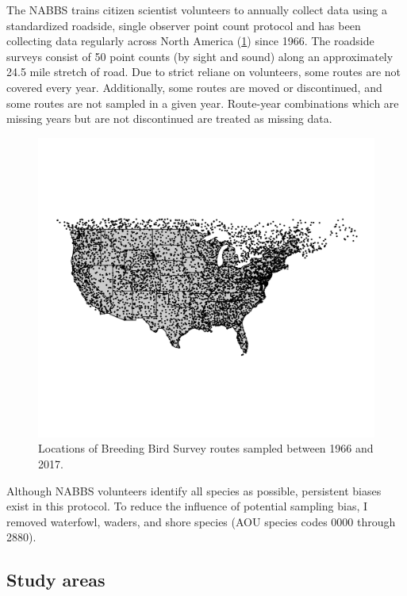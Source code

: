 \documentclass[12pt,twoside,openany]{reedthesis}
\begin{document}
The NABBS trains citizen scientist volunteers to annually collect data
using a standardized roadside, single observer point count protocol and
has been collecting data regularly across North America
(\ref{fig:bbsPoints}) since 1966. The roadside surveys consist of 50
point counts (by sight and sound) along an approximately 24.5 mile
stretch of road. Due to strict reliane on volunteers, some routes are
not covered every year. Additionally, some routes are moved or
discontinued, and some routes are not sampled in a given year.
Route-year combinations which are missing years but are not discontinued
are treated as missing data.
\begin{figure}

{\centering \includegraphics[width=0.85\linewidth]{./chapterFiles/fisherSpatial/figures/figsCalledInDiss/bbsRoutesUsed} 

}

\caption{Locations of Breeding Bird Survey routes sampled between 1966 and 2017.}\label{fig:bbsPoints}
\end{figure}
Although NABBS volunteers identify all species as possible, persistent
biases exist in this protocol. To reduce the influence of potential
sampling bias, I removed waterfowl, waders, and shore species (AOU
species codes 0000 through 2880).

\subsection{Study areas}\label{study-areas}
\end{document}
